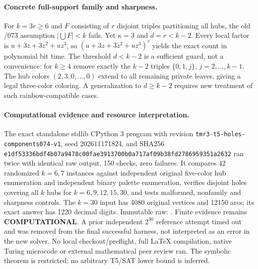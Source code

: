 \documentclass[11pt]{article}
\begin{document}
\paragraph{Concrete full-support family and sharpness.}
For $k=3r\ge6$ and $F$ consisting of $r$ disjoint triples
partitioning all hubs, the old /073 assumption
$|\bigcup F|<k$ fails. Yet $\kappa=3$ and
$d=r<k-2$. Every local factor is
$u+3z+3z^2+uz^3$,
so $(u+3z+3z^2+uz^3)^r$ yields the exact
count in polynomial bit time.
The threshold $d<k-2$ is a sufficient guard,
not a convenience: for $k\ge4$ remove exactly the
$k-2$ triples $\{0,1,j\}$, $j=2,\ldots,k-1$.
The hub colors $(2,3,0,\ldots,0)$ extend to all
remaining private leaves, giving a legal three-color
coloring. A generalization to $d\ge k-2$
requires new treatment of such rainbow-compatible cases.

\paragraph{Computational evidence and resource interpretation.}
The exact standalone stdlib CPython 3 program
with revision \texttt{tmr3-t5-holes-components074-v1},
seed 202611171824, and SHA256
\texttt{e1df53336bdf4b07a9478c00fae3913700b0a717af09b38fd2786959351a2632}
ran twice with identical raw output, 150 checks,
zero failures. It compares 42 randomized $k=6,7$
instances against independent original
five-color hub enumeration and independent binary
palette enumeration, verifies disjoint holes covering
all $k$ hubs for $k=6,9,12,15,30$, and tests malformed,
nonfamily and sharpness controls. The $k=30$ input has
4080 original vertices and 12150 arcs; its exact
answer has 1220 decimal digits.
Immutable raw:
.
Finite evidence remains \textbf{COMPUTATIONAL}.
A prior independent $2^{30}$ reference attempt timed out
and was removed from the final successful harness,
not interpreted as an error in the new solver.
No local checkout/preflight, full \LaTeX{}
compilation, native Turing microcode or external
mathematical peer review ran. The symbolic theorem is
restricted; no arbitrary T5/SAT lower bound is inferred.
\end{document}
